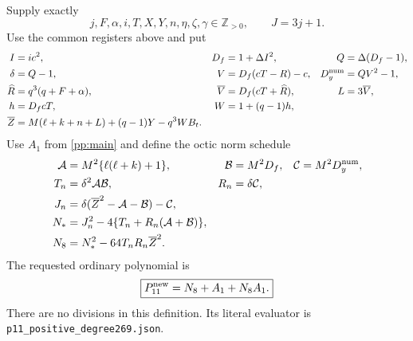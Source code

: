 Supply exactly
\[
 j,F,\alpha,i,T,X,Y,n,\eta,\zeta,\gamma\in\mathbb Z_{>0},
 \qquad J=3j+1.
\]
Use the common registers above and put
\begin{align}
 I&=ic^2,&D_f&=1+\Delta I^2,&Q&=\Delta(D_f-1),\nonumber\\
 \delta&=Q-1,&V&=D_f(cT-R)-c,&D_y^{\rm num}&=QV^2-1,\nonumber\\
 \widehat R&=q^3(q+F+\alpha),&\overline V&=D_f(cT+\widehat R),
       &L&=3\overline V,\nonumber\\
 h&=D_fcT,&W&=1+(q-1)h,\nonumber\\
 \overline Z&=M(\ell+k+n+L)+(q-1)Y-q^3WB_t.       \label{pp:11regs}
\end{align}
Use $A_1$ from \eqref{pp:main} and define the octic norm schedule
\begin{align}
 \mathcal A&=M^2\{\ell(\ell+k)+1\},&
 \mathcal B&=M^2D_f,&\mathcal C&=M^2D_y^{\rm num},\nonumber\\
 T_n&=\delta^2\mathcal A\mathcal B,&R_n&=\delta\mathcal C,\nonumber\\
 J_n&=\delta(\overline Z^2-\mathcal A-\mathcal B)-\mathcal C,\nonumber\\
 N_*&=J_n^2-4\{T_n+R_n(\mathcal A+\mathcal B)\},\nonumber\\
 N_8&=N_*^2-64T_nR_n\overline Z^2.              \label{pp:11norm}
\end{align}
The requested ordinary polynomial is
\begin{equation}
 \boxed{P_{11}^{\rm new}=N_8+A_1+N_8A_1.}       \label{pp:11poly}
\end{equation}
There are no divisions in this definition. Its literal evaluator is
\texttt{p11\_positive\_degree269.json}.

